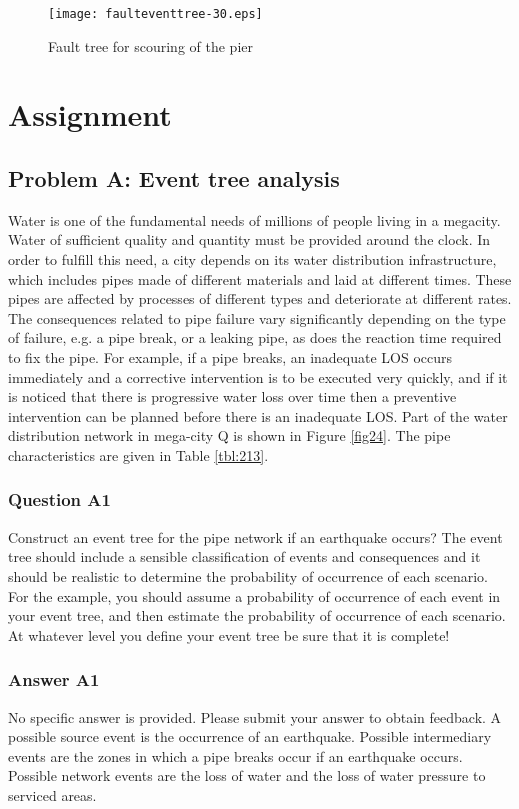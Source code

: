 \begin{figure}[ht]
\begin{center}
\texttt{[image: faulteventtree-30.eps]}
\caption{Fault tree for scouring of the pier}
\end{center}
\end{figure}
\section{Assignment}
\subsection{Problem A: Event tree analysis}
Water is one of the fundamental needs of millions of people living in a
megacity. Water of sufficient quality and quantity must be provided around the
clock. In order to fulfill this need, a city depends on its water distribution
infrastructure, which includes pipes made of different materials and laid at
different times. These pipes are affected by processes of different types and
deteriorate at different rates. The consequences related to pipe failure vary
significantly depending on the type of failure, e.g. a pipe break, or a leaking
pipe, as does the reaction time required to fix the pipe. For example, if a pipe
breaks, an inadequate LOS occurs immediately and a corrective intervention is to
be executed very quickly, and if it is noticed that there is progressive water
loss over time then a preventive intervention can be planned before there is an
inadequate LOS. Part of the water distribution network in mega-city Q is shown in
Figure \ref{fig24}. The pipe characteristics are given in Table \ref{tbl:213}.

\subsubsection{Question A1}
Construct an event tree for the pipe network if an earthquake occurs? The event
tree should include a sensible classification of events and consequences and it
should be realistic to determine the probability of occurrence of each scenario.
For the example, you should assume a probability of occurrence of each event in
your event tree, and then estimate the probability of occurrence of each
scenario. At whatever level you define your event tree be sure that it is
complete!
\subsubsection{Answer A1}
No specific answer is provided. Please submit your answer to obtain feedback. A
possible source event is the occurrence of an earthquake. Possible intermediary
events are the zones in which a pipe breaks occur if an earthquake occurs.
Possible network events are the loss of water and the loss of water pressure to
serviced areas.
